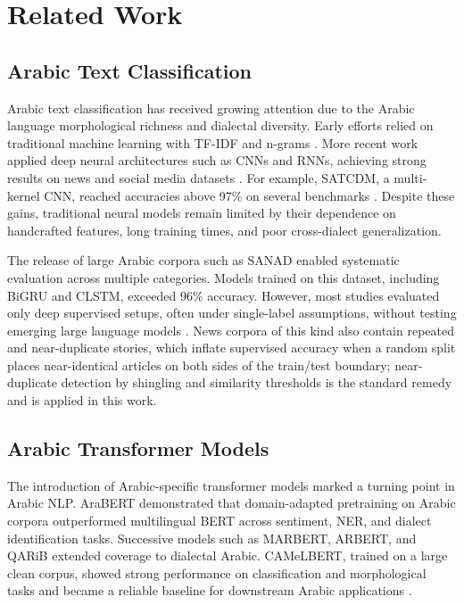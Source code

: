 \documentclass[preprint,12pt,authoryear]{elsarticle}
\newif\ifrevmarkup
\DeclareRobustCommand{\rev}[1]{\ifrevmarkup{\color{blue}#1}\else#1\fi}
\begin{document}
\section{Related Work}
\label{rel-works}

\subsection{Arabic Text Classification}
Arabic text classification has received growing attention due to the Arabic language morphological richness and dialectal diversity. Early efforts relied on traditional machine learning with TF-IDF and n-grams \cite{omar2021multi}. More recent work applied deep neural architectures such as CNNs and RNNs, achieving strong results on news and social media datasets \cite{muaad2022effective,almuzaini2020impact}. For example, SATCDM, a multi-kernel CNN, reached accuracies above 97\% on several benchmarks \cite{alhawarat2020superior}. Despite these gains, traditional neural models remain limited by their dependence on handcrafted features, long training times, and poor cross-dialect generalization.

The release of large Arabic corpora such as SANAD \cite{elnagar2020arabic} enabled systematic evaluation across multiple categories. Models trained on this dataset, including BiGRU and CLSTM, exceeded 96\% accuracy. However, most studies evaluated only deep supervised setups, often under single-label assumptions, without testing emerging large language models \cite{rifai2021arabic,el2022arabic}. \rev{News corpora of this kind also contain repeated and near-duplicate stories, which inflate supervised accuracy when a random split places near-identical articles on both sides of the train/test boundary; near-duplicate detection by shingling and similarity thresholds \cite{broder1997resemblance} is the standard remedy and is applied in this work.}

\subsection{Arabic Transformer Models}
The introduction of Arabic-specific transformer models marked a turning point in Arabic NLP. AraBERT \cite{helwe2020semi} demonstrated that domain-adapted pretraining on Arabic corpora outperformed multilingual BERT across sentiment, NER, and dialect identification tasks. Successive models such as MARBERT, ARBERT, and QARiB extended coverage to dialectal Arabic. CAMeLBERT, trained on a large clean corpus, showed strong performance on classification and morphological tasks and became a reliable baseline for downstream Arabic applications \cite{yagi2021evaluation,elnagar2023benchmark,nassif2022arabic}.
\end{document}
